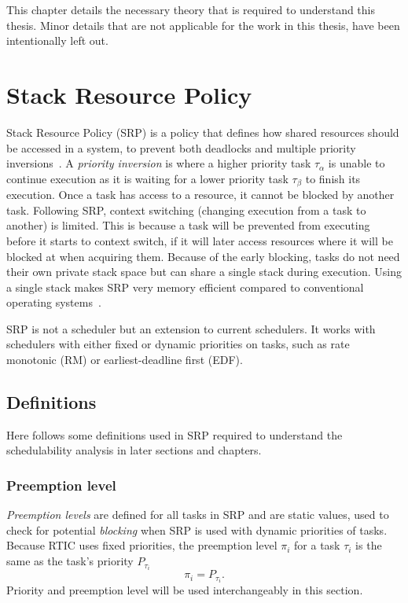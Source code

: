 This chapter details the necessary theory that is required to understand this thesis.
Minor details that are not applicable for the work in this thesis, have been
intentionally left out.

\section{Stack Resource Policy}\label{theory:srp}
Stack Resource Policy (SRP) is a policy that defines how shared resources
should be accessed in a system, to prevent both deadlocks and multiple priority
inversions~\cite{srp}. A \emph{priority inversion} is where a higher priority
task $\tau_\alpha$ is unable to continue execution as it is waiting for a lower
priority task $\tau_\beta$ to finish its execution. Once a task has access to a
resource, it cannot be blocked by another task. Following SRP, context
switching (changing execution from a task to another) is limited. This is
because a task will be prevented from executing before it starts to context
switch, if it will later access resources where it will be blocked at when
acquiring them. Because of the early blocking, tasks do not need their own
private stack space but can share a single stack during execution. Using a
single stack makes SRP very memory efficient compared to conventional operating
systems~\cite{hardrealtimecomputingsystems}.

SRP is not a scheduler but an extension to current schedulers. It works with
schedulers with either fixed or dynamic priorities on tasks, such as rate
monotonic (RM) or earliest-deadline first (EDF).

\subsection{Definitions}\label{theory:srp:definitions}
Here follows some definitions used in SRP required to understand the
schedulability analysis in later sections and chapters.

\subsubsection{Preemption level}\label{theory:srp:definitions:preemption}
\emph{Preemption levels} are defined for all tasks in SRP and are static
values, used to check for potential \emph{blocking} when SRP is used with
dynamic priorities of tasks. Because RTIC uses fixed priorities, the
preemption level $\pi_i$ for a task $\tau_i$ is the same as the task's priority
$P_{\tau_i}$
\begin{equation}
    \pi_i = P_{\tau_i}.
\end{equation}
Priority and preemption level will be used interchangeably in this section.

